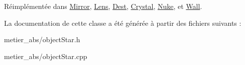 Réimplémentée dans \mbox{\hyperlink{class_mirror_aa943dbc39297e6c9ca0935ec25ecb96e}{Mirror}}, \mbox{\hyperlink{class_lens_a356e82ca429773ef99f3eb2a85b046bf}{Lens}}, \mbox{\hyperlink{class_dest_aa48ab5e846f1dbad232bb59ea94c52ee}{Dest}}, \mbox{\hyperlink{class_crystal_a9efb5c57c177f0f2b627be88b484fe9f}{Crystal}}, \mbox{\hyperlink{class_nuke_aa5b008c32d4189d23695c5e2652e1e30}{Nuke}}, et \mbox{\hyperlink{class_wall_a9ff7569800f55d50d4059ddfd780afe9}{Wall}}.



La documentation de cette classe a été générée à partir des fichiers suivants \+:\begin{DoxyCompactItemize}
\item 
metier\+\_\+abs/object\+Star.\+h\item 
metier\+\_\+abs/object\+Star.\+cpp\end{DoxyCompactItemize}
